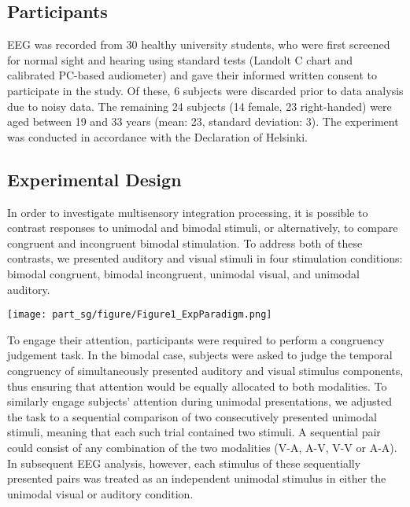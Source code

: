 \label{part_sg_mm}


\subsection{Participants} 


EEG was recorded from 30 healthy university students, who were first
screened for normal sight and hearing using standard tests (Landolt C chart
and calibrated PC-based audiometer) and gave their informed written consent
to participate in the study. Of these, 6 subjects were discarded prior to
data analysis due to noisy data. The remaining 24 subjects (14 female, 23
right-handed) were aged between 19 and 33 years (mean: 23, standard
deviation: 3). The experiment was conducted in accordance with the
Declaration of Helsinki.

\subsection{Experimental Design}

In order to investigate multisensory integration processing, it is possible
to contrast responses to unimodal and bimodal stimuli, or alternatively, to
compare congruent and incongruent bimodal stimulation. To address both of
these contrasts, we presented auditory and visual stimuli in four
stimulation conditions: bimodal congruent, bimodal incongruent, unimodal
visual, and unimodal auditory.  

\begin{SCfigure}[][!htb]
\texttt{[image: part\_sg/figure/Figure1\_ExpParadigm.png]}
\caption[Schematic Diagram of Both Experimental
Paradigms.]{\protect}
\label{expparadigm}\end{SCfigure} 



To engage their attention, participants were required to perform a
congruency judgement task. In the bimodal case, subjects were asked to
judge the temporal congruency of simultaneously presented auditory and
visual stimulus components, thus ensuring that attention would be equally
allocated to both modalities. To similarly engage subjects' attention
during unimodal presentations, we adjusted the task to a sequential
comparison of two consecutively presented unimodal stimuli, meaning that
each such trial contained two stimuli. A sequential pair could consist of
any combination of the two modalities (V-A, A-V, V-V or A-A). In subsequent
EEG analysis, however, each stimulus of these sequentially presented pairs
was treated as an independent unimodal stimulus in either the unimodal
visual or auditory condition. 



